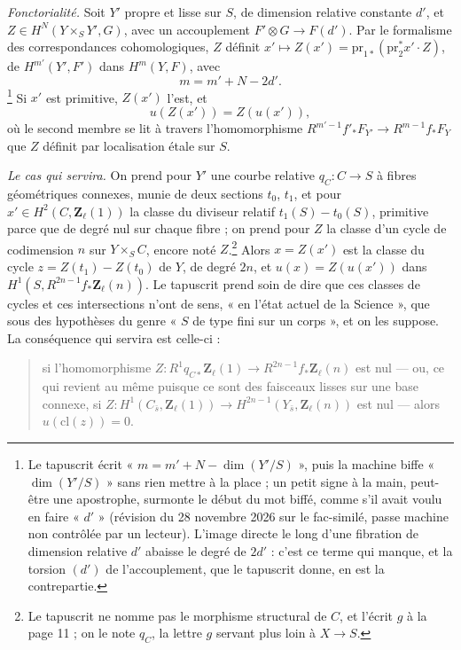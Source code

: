 \documentclass[11pt,a4paper]{article}
\begin{document}
\emph{Fonctorialité.} Soit $Y'$ propre et lisse sur $S$, de dimension relative
constante $d'$, et $Z \in H^N(Y \times_S Y', G)$, avec un accouplement
$F' \otimes G \to F(d')$. Par le formalisme des correspondances cohomologiques,
$Z$ définit $x' \mapsto Z(x') = \mathrm{pr}_{1*}(\mathrm{pr}_2^*x' \cdot Z)$, de
$H^{m'}(Y', F')$ dans $H^m(Y, F)$, avec
\[ m = m' + N - 2d' . \]
\footnote{Le tapuscrit écrit « $m = m' + N - \dim(Y'/S)$ », puis la machine
biffe « $\dim(Y'/S)$ » sans rien mettre à la place ; un petit signe à la main,
peut-être une apostrophe, surmonte le début du mot biffé, comme s'il avait
voulu en faire « $d'$ » (révision du 28 novembre 2026 sur le fac-similé, passe
machine non contrôlée par un lecteur). L'image directe le long d'une
fibration de dimension relative $d'$ abaisse le degré de $2d'$ : c'est ce terme qui
manque, et la torsion $(d')$ de l'accouplement, que le tapuscrit donne, en est la
contrepartie.} Si $x'$ est primitive, $Z(x')$ l'est, et
\[ u(Z(x')) = Z(u(x')) , \]
où le second membre se lit à travers l'homomorphisme
$R^{m'-1}f'_*F_{Y'} \to R^{m-1}f_*F_Y$ que $Z$ définit par localisation étale sur
$S$.

\emph{Le cas qui servira.} On prend pour $Y'$ une courbe relative
$q_C\colon C \to S$ à fibres géométriques connexes, munie de deux sections $t_0$,
$t_1$, et pour $x' \in H^2(C, \mathbf{Z}_\ell(1))$ la classe du diviseur relatif
$t_1(S) - t_0(S)$, primitive parce que de degré nul sur chaque fibre ; on prend
pour $Z$ la classe d'un cycle de codimension $n$ sur $Y \times_S C$, encore noté
$Z$.\footnote{Le tapuscrit ne nomme pas le morphisme structural de $C$, et
l'écrit $g$ à la page 11 ; on le note $q_C$, la lettre $g$ servant plus loin à
$X \to S$.} Alors $x = Z(x')$ est la classe du cycle $z = Z(t_1) - Z(t_0)$ de
$Y$, de degré $2n$, et $u(x) = Z(u(x'))$ dans $H^1(S, R^{2n-1}f_*\mathbf{Z}_\ell(n))$.
Le tapuscrit prend soin de dire que ces classes de cycles et ces intersections
n'ont de sens, « en l'état actuel de la Science », que sous des hypothèses du
genre « $S$ de type fini sur un corps », et on les suppose. La conséquence qui
servira est celle-ci :

\begin{quote}
si l'homomorphisme $Z\colon R^1q_{C*}\mathbf{Z}_\ell(1) \to
R^{2n-1}f_*\mathbf{Z}_\ell(n)$ est nul --- ou, ce qui revient au même puisque ce
sont des faisceaux lisses sur une base connexe, si $Z\colon H^1(C_{\bar s},
\mathbf{Z}_\ell(1)) \to H^{2n-1}(Y_{\bar s}, \mathbf{Z}_\ell(n))$ est nul ---
alors $u(\mathrm{cl}(z)) = 0$.
\end{quote}
\end{document}
